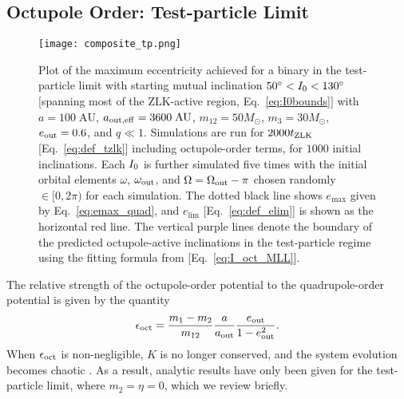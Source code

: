 \documentclass[
        fleqn,
        usenatbib,
    ]{mnras}
\newlength{\colummwidth}
\begin{document}
\subsection{Octupole Order: Test-particle Limit}\label{ss:oct_tp}

\begin{figure}
    \centering
    \texttt{[image: composite\_tp.png]}
    \caption{Plot of the maximum eccentricity achieved for a binary in the
    test-particle limit with starting mutual inclination $50^\circ < I_{\rm 0} <
    130^\circ$ [spanning most of the ZLK-active region, Eq.~\eqref{eq:I0bounds}]
    with $a = 100\;\mathrm{AU}$, $a_{\rm out, eff} = 3600\;\mathrm{AU}$, $m_{12}
    = 50M_{\odot}$, $m_3 = 30M_{\odot}$, $e_{\rm out} = 0.6$, and $q \ll 1$.
    Simulations are run for $2000t_{\rm ZLK}$ [Eq.~\eqref{eq:def_tzlk}]
    including octupole-order terms, for $1000$ initial inclinations. Each
    $I_{\rm 0}$ is further simulated five times with the initial orbital
    elements $\omega$, $\omega_{\rm out}$, and $\Omega = \Omega_{\rm out} - \pi$
    chosen randomly $\in [0, 2\pi)$ %
    for each simulation. The dotted
    black line shows $e_{\max}$ given by Eq.~\eqref{eq:emax_quad}, and
    $e_{\lim}$ [Eq.~\eqref{eq:def_elim}] is shown as the horizontal red line.
    The vertical purple lines denote the boundary of the predicted
    octupole-active inclinations in the test-particle regime using the fitting
    formula from \citet{MLL16} [Eq.~\eqref{eq:I_oct_MLL}].
    }\label{fig:composite_tp}
\end{figure}

The relative strength of the octupole-order potential to the quadrupole-order
potential is given by the quantity
\begin{equation}
    \epsilon_{\rm oct} = \frac{m_1 - m_2}{m_{12}} \frac{a}{a_{\rm out}}
        \frac{e_{\rm out}}{1 - e_{\rm out}^2}.\label{eq:eps_oct}
\end{equation}
When $\epsilon_{\rm oct}$ is non-negligible, $K$ is no longer conserved, and the
system evolution becomes chaotic \citep{ford2000secular, katz2011long,
lithwick2011eccentric}. As a result, analytic results have only been given for
the test-particle limit, where $m_2 = \eta = 0$, which we review briefly.
\end{document}
